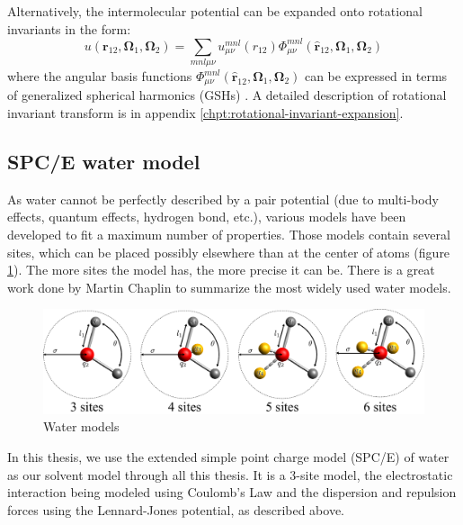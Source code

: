 Alternatively, the intermolecular potential can be expanded onto rotational
invariants in the form:
\begin{equation}
u(\mathbf{r}_{12},\mathbf{\Omega}_{1},\mathbf{\Omega}_{2})=\sum_{mnl\mu\nu}u_{\mu\nu}^{mnl}(r_{12})\Phi_{\mu\nu}^{mnl}(\hat{\mathbf{r}}_{12},\mathbf{\Omega}_{1},\mathbf{\Omega}_{2})
\end{equation}
where the angular basis functions $\Phi_{\mu\nu}^{mnl}(\hat{\mathbf{r}}_{12},\mathbf{\Omega}_{1},\mathbf{\Omega}_{2})$
can be expressed in terms of generalized spherical harmonics (\acs{GSH}s)
\citep{Gray-Gubbins}. A detailed description of rotational invariant
transform is in appendix \ref{chpt:rotational-invariant-expansion}.

\subsection{SPC/E water model}

As water cannot be perfectly described by a pair potential (due to
multi-body effects, quantum effects, hydrogen bond, etc.), various
models have been developed to fit a maximum number of properties.
Those models contain several sites, which can be placed possibly elsewhere
than at the center of atoms (figure \ref{fig:Water-models}). The
more sites the model has, the more precise it can be. There is a great
work done by Martin Chaplin \citep{water-model} to summarize the
most widely used water models.

\begin{figure}[h]
\begin{centering}
\includegraphics[width=0.75\columnwidth]{_figure/water}
\par\end{centering}
\caption{Water models\label{fig:Water-models}}
\end{figure}

In this thesis, we use the extended simple point charge model (SPC/E)
of water \citep{SPC/E} as our solvent model through all this thesis.
 It is a 3-site model, the electrostatic interaction being modeled
using Coulomb's Law and the dispersion and repulsion forces using
the Lennard-Jones potential, as described above.

